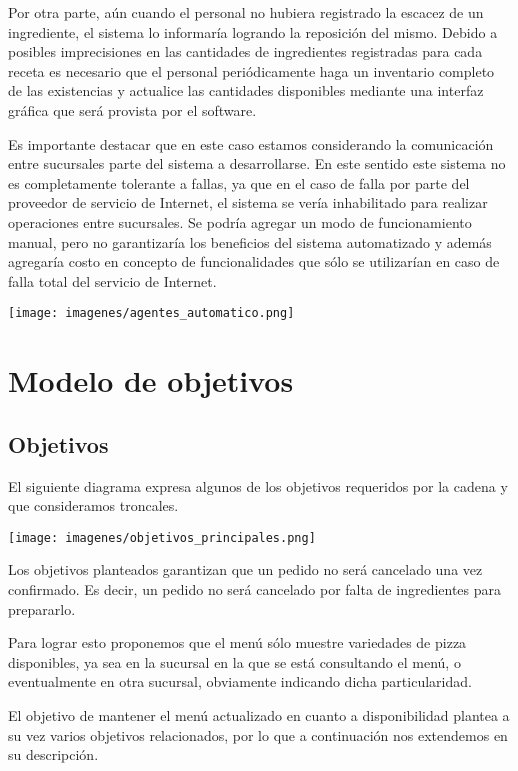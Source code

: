 \documentclass[a4paper,10pt]{article}
\begin{document}
Por otra parte, aún cuando el personal no hubiera registrado la escacez de un ingrediente, el sistema lo informaría logrando la reposición del mismo. Debido a posibles imprecisiones en las cantidades de ingredientes registradas para cada receta es necesario que el personal periódicamente haga un inventario completo de las existencias y actualice las cantidades disponibles mediante una interfaz gráfica que será provista por el software.

Es importante destacar que en este caso estamos considerando la comunicación entre sucursales parte del sistema a desarrollarse. En este sentido este sistema no es completamente tolerante a fallas, ya que en el caso de falla por parte del proveedor de servicio de Internet, el sistema se vería inhabilitado para realizar operaciones entre sucursales. Se podría agregar un modo de funcionamiento manual, pero no garantizaría los beneficios del sistema automatizado y además agregaría costo en concepto de funcionalidades que sólo se utilizarían en caso de falla total del servicio de Internet. 

\texttt{[image: imagenes/agentes\_automatico.png]}



\section*{Modelo de objetivos}
\subsection*{Objetivos}
\noindent

El siguiente diagrama expresa algunos de los objetivos requeridos por la cadena y que consideramos troncales.


\texttt{[image: imagenes/objetivos\_principales.png]}

Los objetivos planteados garantizan que un pedido no será cancelado una vez confirmado. Es decir, un pedido no será cancelado por falta de ingredientes para prepararlo. 

Para lograr esto proponemos que el menú sólo muestre variedades de pizza disponibles, ya sea en la sucursal en la que se está consultando el menú, o eventualmente en otra sucursal, obviamente indicando dicha particularidad.

El objetivo de mantener el menú actualizado en cuanto a disponibilidad plantea a su vez varios objetivos relacionados, por lo que a continuación nos extendemos en su descripción.
\end{document}
